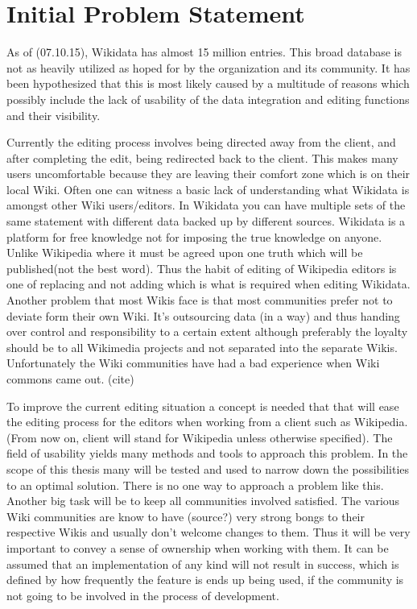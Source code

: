 \section{Initial Problem Statement}


As of (07.10.15), Wikidata has almost 15 million entries. This broad database is not as heavily utilized as hoped for by the organization and its community. It has been hypothesized that this is most likely caused by a multitude of reasons which possibly include the lack of usability of the data integration and editing functions and their visibility.

Currently the editing process involves being directed away from the client, and after completing the edit, being redirected back to the client. This makes many users uncomfortable because they are leaving their comfort zone which is on their local Wiki. Often one can witness a basic lack of understanding what Wikidata is amongst other Wiki users/editors. 
In Wikidata you can have multiple sets of the same statement with different data backed up by different sources. Wikidata is a platform for free knowledge not for imposing the true knowledge on anyone. Unlike Wikipedia where it must be agreed upon one truth which will be published(not the best word). Thus the habit of editing of Wikipedia editors is one of replacing and not adding which is what is required when editing Wikidata. 
Another problem that most Wikis face is that most communities prefer not to deviate form their own Wiki. It's outsourcing data (in a way) and thus handing over control and responsibility to a certain extent although preferably the loyalty should be to all Wikimedia projects and not separated into the separate Wikis. 
Unfortunately the Wiki communities have had a bad experience when Wiki commons came out. (cite)

To improve the current editing situation a concept is needed that that will ease the editing process for the editors when working from a client such as Wikipedia. (From now on, client will stand for Wikipedia unless otherwise specified). The field of usability yields many methods and tools to approach this problem. In the scope of this thesis many will be tested and used to narrow down the possibilities to an optimal solution. There is no one way to approach a problem like this. 
Another big task will be to keep all communities involved satisfied. The various Wiki communities are know to have (source?) very strong bongs to their respective Wikis and usually don't welcome changes to them. Thus it will be very important to convey a sense of ownership when working with them. It can be assumed that an implementation of any kind will not result in success, which is defined by how frequently the feature is ends up being used, if the community is not going to be involved in the process of development. 

